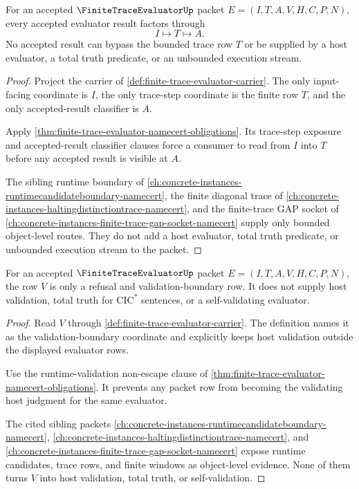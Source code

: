
\begin{theorem}
\label{thm:finite-trace-evaluator-bounded-trace-coverage}
For an accepted $\FiniteTraceEvaluatorUp$ packet
$E=(I,T,A,V,H,C,P,N)$, every accepted evaluator result factors through
$$
I \longmapsto T \longmapsto A.
$$
No accepted result can bypass the bounded trace row $T$ or be supplied by a host evaluator, a total truth predicate, or an unbounded execution stream.
\end{theorem}
\begin{proof}
Project the carrier of \autoref{def:finite-trace-evaluator-carrier}. The only input-facing coordinate is $I$, the only trace-step coordinate is the finite row $T$, and the only accepted-result classifier is $A$.

Apply \autoref{thm:finite-trace-evaluator-namecert-obligations}. Its trace-step exposure and accepted-result classifier clauses force a consumer to read from $I$ into $T$ before any accepted result is visible at $A$.

The sibling runtime boundary of \autoref{ch:concrete-instances-runtimecandidateboundary-namecert}, the finite diagonal trace of \autoref{ch:concrete-instances-haltingdistinctiontrace-namecert}, and the finite-trace GAP socket of \autoref{ch:concrete-instances-finite-trace-gap-socket-namecert} supply only bounded object-level routes. They do not add a host evaluator, total truth predicate, or unbounded execution stream to the packet.
\end{proof}

\begin{theorem}
\label{thm:finite-trace-evaluator-host-validation-refusal-ledger}
For an accepted $\FiniteTraceEvaluatorUp$ packet
$E=(I,T,A,V,H,C,P,N)$, the row $V$ is only a refusal and validation-boundary row. It does not supply host validation, total truth for $\mathrm{CIC}^{*}$ sentences, or a self-validating evaluator.
\end{theorem}
\begin{proof}
Read $V$ through \autoref{def:finite-trace-evaluator-carrier}. The definition names it as the validation-boundary coordinate and explicitly keeps host validation outside the displayed evaluator rows.

Use the runtime-validation non-escape clause of \autoref{thm:finite-trace-evaluator-namecert-obligations}. It prevents any packet row from becoming the validating host judgment for the same evaluator.

The cited sibling packets \autoref{ch:concrete-instances-runtimecandidateboundary-namecert}, \autoref{ch:concrete-instances-haltingdistinctiontrace-namecert}, and \autoref{ch:concrete-instances-finite-trace-gap-socket-namecert} expose runtime candidates, trace rows, and finite windows as object-level evidence. None of them turns $V$ into host validation, total truth, or self-validation.
\end{proof}

